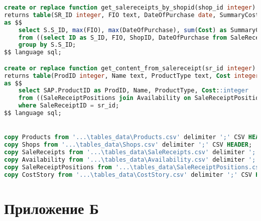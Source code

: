 \documentclass{bmstu}
\begin{document}
\begin{lstlisting}[language=sql, caption={Сценарий создания БД}]
create or replace function get_salereceipts_by_shopid(shop_id integer)
returns table(SR_ID integer, FIO text, DateOfPurchase date, SummaryCost integer)
as $$
	select S.S_ID, max(FIO), max(DateOfPurchase), sum(Cost) as SummaryCost
	from ((select ID as S_ID, FIO, ShopID, DateOfPurchase from SaleReceipts where ShopID = shop_id) as SR join SaleReceiptPositions on SaleReceiptPositions.SaleReceiptID = SR.S_ID) as S join Costs on S.AvailabilityID = Costs.AvailabilityID
	group by S.S_ID;
$$ language sql;

create or replace function get_content_from_salereceipt(sr_id integer)
returns table(ProdID integer, Name text, ProductType text, Cost integer)
as $$
	select SAP.ProductID as ProdID, Name, ProductType, Cost::integer
	from ((SaleReceiptPositions join Availability on SaleReceiptPositions.AvailabilityID = Availability.ID) as SA join Products on Products.ID = SA.ProductID) as SAP join Costs on SAP.AvailabilityID = Costs.AvailabilityID
	where SaleReceiptID = sr_id;
$$ language sql;


copy Products from '...\tables_data\Products.csv' delimiter ';' CSV HEADER;
copy Shops from '...\tables_data\Shops.csv' delimiter ';' CSV HEADER;
copy SaleReceipts from '...\tables_data\SaleReceipts.csv' delimiter ';' CSV HEADER;
copy Availability from '...\tables_data\Availability.csv' delimiter ';' CSV HEADER;
copy SaleReceiptPositions from '...\tables_data\SaleReceiptPositions.csv' delimiter ';' CSV HEADER;
copy CostStory from '...\tables_data\CostStory.csv' delimiter ';' CSV HEADER;
\end{lstlisting}

\section*{Приложение Б}
\end{document}
